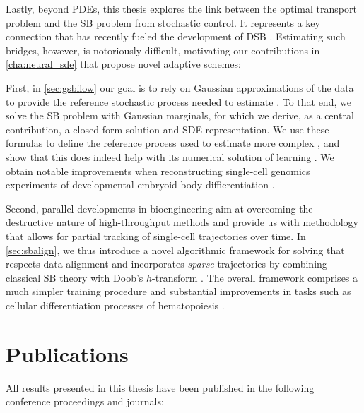 Lastly, beyond PDEs, this thesis explores the link between the optimal transport problem and the \acrfull{SB} problem from stochastic control. It represents a key connection that has recently fueled the development of \acrfull{DSB} \citep{de2021diffusion, chen2021stochastic, liu2022deep, bunne2022recovering}. Estimating such bridges, however, is notoriously difficult, motivating our contributions in \cref{cha:neural_sde} that propose novel adaptive schemes:

First, in \cref{sec:gsbflow} our goal is to rely on Gaussian approximations of the data to provide the reference stochastic process needed to estimate . To that end, we solve the \acrlong{SB} problem with Gaussian marginals, for which we derive, as a central contribution, a closed-form solution and SDE-representation. We use these formulas to define the reference process used to estimate more complex , and show that this does indeed help with its numerical solution of learning . We obtain notable improvements when reconstructing single-cell genomics experiments of developmental embryoid body diffierentiation \citep{bunne2022recovering}.

Second, parallel developments in bioengineering aim at overcoming the destructive nature of high-throughput methods and provide us with methodology that allows for partial tracking of single-cell trajectories over time.
In \cref{sec:sbalign}, we thus introduce a novel algorithmic framework for solving  that respects data alignment and incorporates \emph{sparse} trajectories by combining classical \acrlong{SB} theory with Doob's 
$h$-transform \citep{somnath2023aligned}. The overall framework comprises a much simpler training procedure and substantial improvements in tasks such as cellular differentiation processes of hematopoiesis \citep{weinreb2020lineage}.



\newpage
\section{Publications}
All results presented in this thesis have been published in the following conference proceedings and journals:

